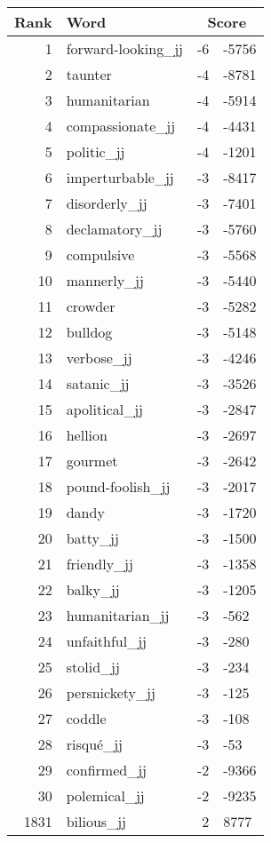 \begin{longtable}[!htbp]{| rlr@{.}l |}
    \hline
    \textbf{Rank} & \textbf{Word} & \multicolumn{2}{c|}{\textbf{Score}} \\
    \hline
    \endhead
    1 & forward-looking\_jj & -6 & -5756 \\
    2 & taunter & -4 & -8781 \\
    3 & humanitarian & -4 & -5914 \\
    4 & compassionate\_jj & -4 & -4431 \\
    5 & politic\_jj & -4 & -1201 \\
    6 & imperturbable\_jj & -3 & -8417 \\
    7 & disorderly\_jj & -3 & -7401 \\
    8 & declamatory\_jj & -3 & -5760 \\
    9 & compulsive & -3 & -5568 \\
    10 & mannerly\_jj & -3 & -5440 \\
    11 & crowder & -3 & -5282 \\
    12 & bulldog & -3 & -5148 \\
    13 & verbose\_jj & -3 & -4246 \\
    14 & satanic\_jj & -3 & -3526 \\
    15 & apolitical\_jj & -3 & -2847 \\
    16 & hellion & -3 & -2697 \\
    17 & gourmet & -3 & -2642 \\
    18 & pound-foolish\_jj & -3 & -2017 \\
    19 & dandy & -3 & -1720 \\
    20 & batty\_jj & -3 & -1500 \\
    21 & friendly\_jj & -3 & -1358 \\
    22 & balky\_jj & -3 & -1205 \\
    23 & humanitarian\_jj & -3 & -562 \\
    24 & unfaithful\_jj & -3 & -280 \\
    25 & stolid\_jj & -3 & -234 \\
    26 & persnickety\_jj & -3 & -125 \\
    27 & coddle & -3 & -108 \\
    28 & risqué\_jj & -3 & -53 \\
    29 & confirmed\_jj & -2 & -9366 \\
    30 & polemical\_jj & -2 & -9235 \\
    1831 & bilious\_jj & 2 & 8777 \\

\end{longtable}
